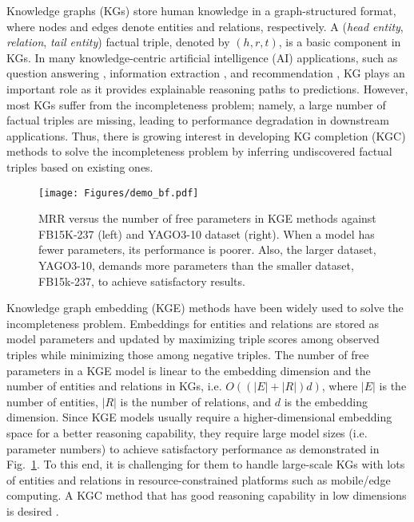\documentclass{article}
\begin{document}
Knowledge graphs (KGs) store human knowledge in a graph-structured
format, where nodes and edges denote entities and relations,
respectively. A (\emph{head entity}, \emph{relation}, \emph{tail
entity}) factual triple, denoted by $(h, r, t)$, is a basic
component in KGs. In many knowledge-centric artificial intelligence (AI)
applications, such as question answering \citep{huang2019knowledge,
saxena2020improving}, information extraction 
\citep{hoffmann2011knowledge, daiber2013improving}, 
and recommendation \citep{wang2019explainable,
xian2019reinforcement}, KG plays an important role as it provides
explainable reasoning paths to predictions. However, most KGs suffer
from the incompleteness problem; namely, a large number of factual
triples are missing, leading to performance degradation in downstream
applications. Thus, there is growing interest in developing KG
completion (KGC) methods to solve the incompleteness problem by inferring 
undiscovered factual triples based on existing ones. 
\begin{figure}[t]
\centering
\texttt{[image: Figures/demo\_bf.pdf]}
\caption{MRR versus the number of free parameters in
KGE methods against FB15K-237 (left) and YAGO3-10
dataset (right). When a model has fewer parameters, its performance is
poorer. Also, the larger dataset, YAGO3-10, demands more
parameters than the smaller dataset, FB15k-237, to achieve satisfactory results.}
\label{fig:dimension}
\end{figure}
Knowledge graph embedding (KGE) methods have been widely used to solve
the incompleteness problem. Embeddings for entities and relations are
stored as model parameters and updated by maximizing triple scores among
observed triples while minimizing those among negative triples. The number of
free parameters in a KGE model is linear to the embedding dimension and the
number of entities and relations in KGs, i.e. $O((|E| + |R|)d)$, where
$|E|$ is the number of entities, $|R|$ is the number of relations, and
$d$ is the embedding dimension. Since KGE models usually require a
higher-dimensional embedding space for a better reasoning capability,
they require large model sizes (i.e. parameter numbers) to achieve
satisfactory performance as demonstrated in Fig.~\ref{fig:dimension}.
To this end, it is challenging for them to handle large-scale KGs with
lots of entities and relations in resource-constrained platforms such as
mobile/edge computing. A KGC method that has good reasoning capability
in low dimensions is desired \cite{kuo2022green}. 
\end{document}
